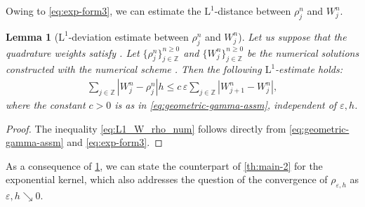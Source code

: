 \documentclass[10pt]{amsart}
\theoremstyle{plain}
\newtheorem{lemma}{Lemma}[section]
\theoremstyle{definition}
\numberwithin{equation}{section}
\newcommand{\eps}{{\varepsilon}}
\begin{document}
Owing to \cref{eq:exp-form3}, we can estimate the $\mathrm{L}^1$-distance between $\rho_j^n$ and $W_j^n$.

\begin{lemma}[$\mathrm{L}^1$-deviation estimate between $\rho_j^n$ and $W_j^n$]\label{lm:limit-same}
Let us suppose that the quadrature weights satisfy . Let $\{\rho_j^n\}_{j\in\mathbb{Z}}^{n\geq0}$ and $\{W_j^n\}_{j\in\mathbb{Z}}^{n\geq0}$ be the numerical solutions constructed with the numerical scheme . Then the following $\mathrm{L}^1$-estimate holds:
    \begin{align}\label{eq:L1_W_rho_num}
        \sum_{j \in \mathbb Z} |W_j^n-\rho_j^n| h \leq c\,\eps  \sum_{j \in \mathbb Z} |W^n_{j+1} - W^n_j|,
    \end{align}
    where the constant $c>0$ is as in \cref{eq:geometric-gamma-assm}, independent of $\eps,h$.
\end{lemma}

\begin{proof}
    The inequality \cref{eq:L1_W_rho_num} follows directly from \cref{eq:geometric-gamma-assm} and \cref{eq:exp-form3}.
\end{proof}


As a consequence of \cref{lm:limit-same}, we can state the counterpart of \cref{th:main-2} for the exponential kernel, which also addresses the question of the convergence of $\rho_{\eps,h}$ as $\eps,h\searrow 0$.
\end{document}
